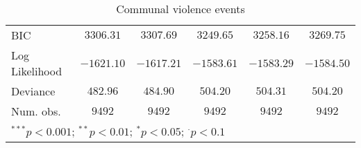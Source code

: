 \begin{sidewaystable}
\begin{center}
{\begin{tabular}{l c c c c c}
BIC                                   & $3306.31$     & $3307.69$    & $3249.65$    & $3258.16$    & $3269.75$    \\
Log Likelihood                        & $-1621.10$    & $-1617.21$   & $-1583.61$   & $-1583.29$   & $-1584.50$   \\
Deviance                              & $482.96$      & $484.90$     & $504.20$     & $504.31$     & $504.20$     \\
Num. obs.                             & $9492$        & $9492$       & $9492$       & $9492$       & $9492$       \\
\hline
\multicolumn{6}{l}{\scriptsize{$^{***}p<0.001$; $^{**}p<0.01$; $^{*}p<0.05$; $^{\cdot}p<0.1$}}
\end{tabular}
}
\caption{Communal violence events}
\label{org3}
\end{center}
\end{sidewaystable}
